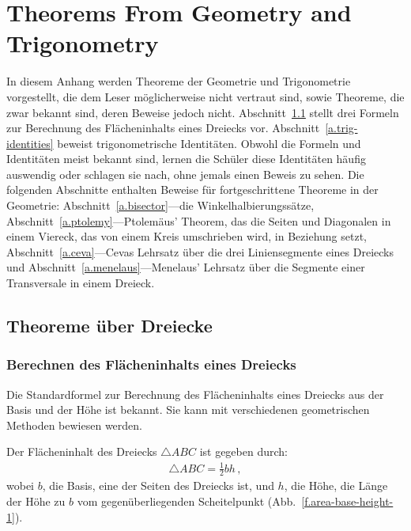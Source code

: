 
\chapter{Theorems From Geometry and Trigonometry}\label{a.trig}


In diesem Anhang werden Theoreme der Geometrie und Trigonometrie vorgestellt, die dem Leser möglicherweise nicht vertraut sind, sowie Theoreme, die zwar bekannt sind, deren Beweise jedoch nicht. Abschnitt~\ref{a.triangles} stellt drei Formeln zur Berechnung des Flächeninhalts eines Dreiecks vor. Abschnitt~\ref{a.trig-identities} beweist trigonometrische Identitäten. Obwohl die Formeln und Identitäten meist bekannt sind, lernen die Schüler diese Identitäten häufig auswendig oder schlagen sie nach, ohne jemals einen Beweis zu sehen. Die folgenden Abschnitte enthalten Beweise für fortgeschrittene Theoreme in der Geometrie: Abschnitt~\ref{a.bisector}---die Winkelhalbierungssätze, Abschnitt~\ref{a.ptolemy}---Ptolemäus' Theorem, das die Seiten und Diagonalen in einem Viereck, das von einem Kreis umschrieben wird, in Beziehung setzt, Abschnitt~\ref{a.ceva}---Cevas Lehrsatz über die drei Liniensegmente eines Dreiecks und Abschnitt~\ref{a.menelaus}---Menelaus' Lehrsatz über die Segmente einer Transversale in einem Dreieck.


\section{Theoreme über Dreiecke}\label{a.triangles}


\subsection{Berechnen des Flächeninhalts eines Dreiecks}


Die Standardformel zur Berechnung des Flächeninhalts eines Dreiecks aus der Basis und der Höhe ist bekannt. Sie kann mit verschiedenen geometrischen Methoden bewiesen werden.

\begin{theorem} Der Flächeninhalt des Dreiecks $\triangle ABC$ ist gegeben durch:
\begin{align}
\triangle ABC=\frac{1}{2}bh\,,\label{eq.area-from-base}
\end{align}
wobei $b$, die Basis, eine der Seiten des Dreiecks ist, und $h$, die Höhe, die Länge der Höhe zu $b$ vom gegenüberliegenden Scheitelpunkt (Abb.~\ref{f.area-base-height-1}).
\end{theorem}

